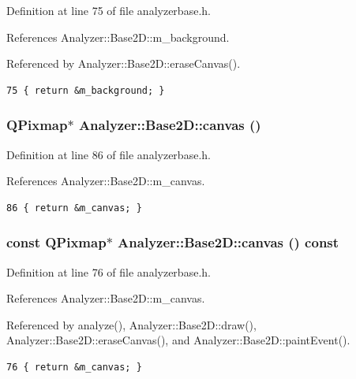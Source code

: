 Definition at line 75 of file analyzerbase.h.

References Analyzer::Base2D::m\_\-background.

Referenced by Analyzer::Base2D::erase\-Canvas().



\footnotesize\begin{verbatim}75 { return &m_background; }
\end{verbatim}\normalsize 
{}
\subsubsection{\setlength{\rightskip}{0pt plus 5cm}QPixmap$\ast$ Analyzer::Base2D::canvas ()\hspace{0.3cm}{\tt  [inline, protected, inherited]}}\label{classAnalyzer_1_1Base2D_Sonogramb0}




Definition at line 86 of file analyzerbase.h.

References Analyzer::Base2D::m\_\-canvas.



\footnotesize\begin{verbatim}86 { return &m_canvas; }
\end{verbatim}\normalsize 
{}
\subsubsection{\setlength{\rightskip}{0pt plus 5cm}const QPixmap$\ast$ Analyzer::Base2D::canvas () const\hspace{0.3cm}{\tt  [inline, inherited]}}\label{classAnalyzer_1_1Base2D_Sonograma7}




Definition at line 76 of file analyzerbase.h.

References Analyzer::Base2D::m\_\-canvas.

Referenced by analyze(), Analyzer::Base2D::draw(), Analyzer::Base2D::erase\-Canvas(), and Analyzer::Base2D::paint\-Event().



\footnotesize\begin{verbatim}76 { return &m_canvas; }
\end{verbatim}\normalsize 
{}

